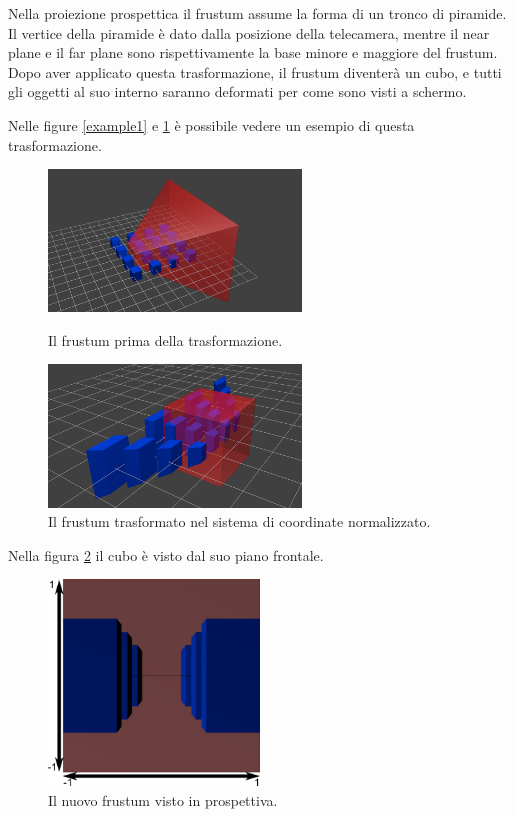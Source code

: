 Nella proiezione prospettica il frustum assume la forma di un tronco di piramide.
Il vertice della piramide è dato dalla posizione della telecamera, mentre il near plane e il far plane sono rispettivamente la base minore e maggiore del frustum. Dopo aver applicato questa trasformazione, il frustum diventerà un cubo, e tutti gli oggetti al suo interno saranno deformati per come sono visti a schermo.

Nelle figure \ref{example1} e \ref{example2} è possibile vedere un esempio di questa trasformazione.
\begin{figure}[htbp]
\centering
\includegraphics[width=0.6\textwidth]{images/frustum/frustum_cubes.png}
\caption{Il frustum prima della trasformazione.\label{example1}}
\includegraphics[width=0.6\textwidth]{images/frustum/frustum_homogeneous.png}
\caption{Il frustum trasformato nel sistema di coordinate normalizzato.\label{example2}}
\end{figure}

Nella figura \ref{example3} il cubo è visto dal suo piano frontale.

\begin{figure}[htbp]
\centering
\includegraphics[width=0.5\textwidth]{images/frustum/frustum_view.png}
\caption{Il nuovo frustum visto in prospettiva.\label{example3}}
\end{figure}

